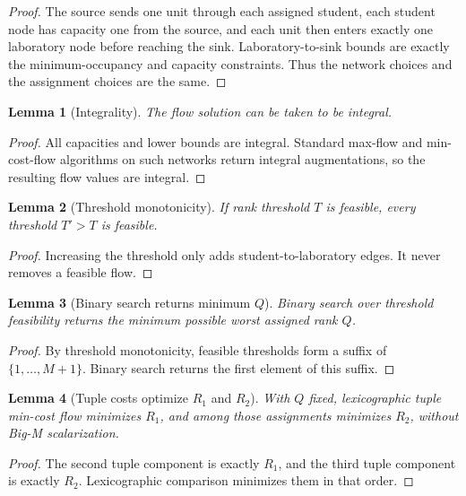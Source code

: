 \documentclass[11pt,a4paper]{article}
\newtheorem{lemma}{Lemma}
\begin{document}
\begin{proof}
The source sends one unit through each assigned student, each student node has
capacity one from the source, and each unit then enters exactly one laboratory
node before reaching the sink.  Laboratory-to-sink bounds are exactly the
minimum-occupancy and capacity constraints.  Thus the network choices and the
assignment choices are the same.
\end{proof}

\begin{lemma}[Integrality]
The flow solution can be taken to be integral.
\end{lemma}

\begin{proof}
All capacities and lower bounds are integral.  Standard max-flow and
min-cost-flow algorithms on such networks return integral augmentations, so
the resulting flow values are integral.
\end{proof}

\begin{lemma}[Threshold monotonicity]
If rank threshold \(T\) is feasible, every threshold \(T'>T\) is feasible.
\end{lemma}

\begin{proof}
Increasing the threshold only adds student-to-laboratory edges.  It never
removes a feasible flow.
\end{proof}

\begin{lemma}[Binary search returns minimum \(Q\)]
Binary search over threshold feasibility returns the minimum possible worst
assigned rank \(Q\).
\end{lemma}

\begin{proof}
By threshold monotonicity, feasible thresholds form a suffix of
\(\{1,\ldots,M+1\}\).  Binary search returns the first element of this suffix.
\end{proof}

\begin{lemma}[Tuple costs optimize \(R_1\) and \(R_2\)]
With \(Q\) fixed, lexicographic tuple min-cost flow minimizes \(R_1\), and
among those assignments minimizes \(R_2\), without Big-M scalarization.
\end{lemma}

\begin{proof}
The second tuple component is exactly \(R_1\), and the third tuple component
is exactly \(R_2\).  Lexicographic comparison minimizes them in that order.
\end{proof}
\end{document}
